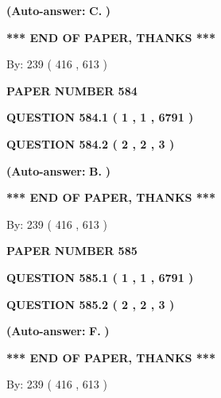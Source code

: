 \documentclass[12pt]{article}
\begin{document}
 
{\textbf{(Auto-answer:}}
{\textbf{\large{
C.}}}
{\textbf{)}}
 
 
   
   
   
   
\vspace{1.0in} 
{\textbf{\large{ *** END OF PAPER, THANKS *** }}} 
   
   
\hspace{1.0in} By: 
 239 ( 416 ,  613 )
   
   
   
   
\newpage 
\setcounter{page}{ 
   584001 } 
   
   
 {\textbf{ \Large{ PAPER NUMBER  584  }}}
   
   
   
   
  
  
{\textbf{\large{QUESTION
584.1 
 ( 1 , 1 , 6791 )
}}}
  
  
{\textbf{\large{QUESTION
584.2 
 ( 2 , 2 , 3 )
}}}
 
 
{\textbf{(Auto-answer:}}
{\textbf{\large{
B.}}}
{\textbf{)}}
 
 
   
   
   
   
\vspace{1.0in} 
{\textbf{\large{ *** END OF PAPER, THANKS *** }}} 
   
   
\hspace{1.0in} By: 
 239 ( 416 ,  613 )
   
   
   
   
\newpage 
\setcounter{page}{ 
   585001 } 
   
   
 {\textbf{ \Large{ PAPER NUMBER  585  }}}
   
   
   
   
  
  
{\textbf{\large{QUESTION
585.1 
 ( 1 , 1 , 6791 )
}}}
  
  
{\textbf{\large{QUESTION
585.2 
 ( 2 , 2 , 3 )
}}}
 
 
{\textbf{(Auto-answer:}}
{\textbf{\large{
F.}}}
{\textbf{)}}
 
 
   
   
   
   
\vspace{1.0in} 
{\textbf{\large{ *** END OF PAPER, THANKS *** }}} 
   
   
\hspace{1.0in} By: 
 239 ( 416 ,  613 )
   
   
   
   
\newpage 
\setcounter{page}{ 
   586001 } 
   
\end{document}
